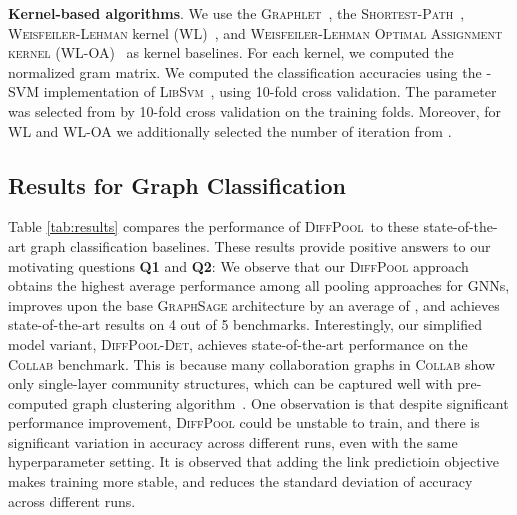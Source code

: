\documentclass{article}
\newcommand{\xhdr}[1]{{\noindent\bfseries #1}.}
\newcommand{\name}{\textsc{DiffPool}\xspace}
\newcommand{\cut}[1]{}
\begin{document}
\xhdr{Kernel-based algorithms}
We use the \textsc{Graphlet}~\cite{She+2009}, the \textsc{Shortest-Path}~\cite{Borgwardt2005}, \textsc{Weisfeiler-Lehman} kernel (\textsc{WL})~\cite{She+2011}, and \textsc{Weisfeiler-Lehman Optimal Assignment kernel} (\textsc{WL-OA})~\cite{kriege2016valid} as kernel baselines. For each kernel, we computed the normalized gram matrix. We computed the classification accuracies using the -SVM implementation of \textsc{LibSvm}~\cite{Cha+11}, using 10-fold cross validation. The  parameter was selected from   by 10-fold cross validation on the training folds. Moreover, for \textsc{WL} and \textsc{WL-OA} we additionally selected the number of iteration from .

\subsection{Results for Graph Classification}\label{sec:classification}
Table \ref{tab:results} compares the performance of \name\ to these state-of-the-art graph classification baselines.
These results provide positive answers to our motivating questions {\bf Q1} and {\bf Q2}:
We observe that our \name approach obtains the highest average performance among all pooling approaches for GNNs, improves upon the base \textsc{GraphSage} architecture by an average of , and achieves state-of-the-art results on 4 out of 5 benchmarks. Interestingly, our simplified model variant, \textsc{\name-Det}, achieves state-of-the-art performance on the \textsc{Collab} benchmark. This is because many collaboration graphs in \textsc{Collab} show only single-layer community structures, which can be captured well with pre-computed graph clustering algorithm~\cite{dhillon2007weighted}.
One observation is that despite significant performance improvement, \name could be unstable to train, and there is significant variation in accuracy across different runs, even with the same hyperparameter setting. It is observed that adding the link predictioin objective makes training more stable, and reduces the standard deviation of accuracy across different runs.
\cut{
Among the baseline methods, the kernel-based \textsc{WL-OA} also performs quite well, achieving the second-best accuracy on the \textsc{Collab} benchmark, which contains exceptionally dense graphs. 
applied on top of \textsc{GraphSage} with GNNs using other pooling methods, as well as kernel-based methods. In the last column we report the percentage gain of each GNN pooling baseline over \textsc{GraphSage} with naive mean pooling.
\textsc{Set2Set} aggregation has shown to give significant gains in many data sets, achieving an average of  improvement compared to the naive baseline of \textsc{GraphSage} with global pooling. However, \textsc{Set2Set} aggregation has longer running time: it runs  times slower than \name on average.
In comparison, \textsc{PatchySan}, \textsc{SortPool} and \textsc{ClusterPool}  all achieve better results, due to their ability to pool according to structures of the graphs. 
}
\end{document}
